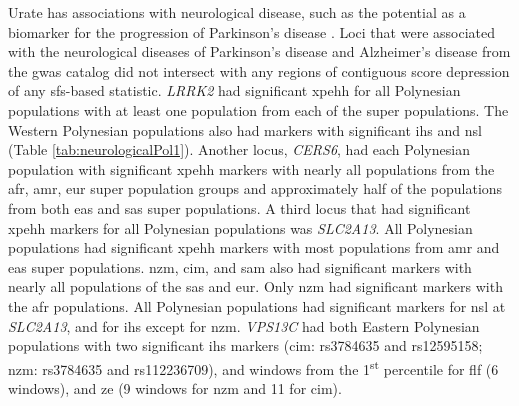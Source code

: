 \documentclass[]{report}
\begin{document}
Urate has associations with neurological disease, such as the potential
as a biomarker for the progression of Parkinson's disease
\citep{Wen2017}. Loci that were associated with the neurological
diseases of Parkinson's disease and Alzheimer's disease from the
\gls{gwas} catalog did not intersect with any regions of contiguous
score depression of any \gls{sfs}-based statistic. \emph{LRRK2} had
significant \gls{xpehh} for all Polynesian populations with at least one
population from each of the super populations. The Western Polynesian
populations also had markers with significant \gls{ihs} and \gls{nsl}
(Table \ref{tab:neurologicalPol1}). Another locus, \emph{CERS6}, had
each Polynesian population with significant \gls{xpehh} markers with
nearly all populations from the \gls{afr}, \gls{amr}, \gls{eur} super
population groups and approximately half of the populations from both
\gls{eas} and \gls{sas} super populations. A third locus that had
significant \gls{xpehh} markers for all Polynesian populations was
\emph{SLC2A13}. All Polynesian populations had significant \gls{xpehh}
markers with most populations from \gls{amr} and \gls{eas} super
populations. \Gls{nzm}, \gls{cim}, and \gls{sam} also had significant
markers with nearly all populations of the \gls{sas} and \gls{eur}. Only
\gls{nzm} had significant markers with the \gls{afr} populations. All
Polynesian populations had significant markers for \gls{nsl} at
\emph{SLC2A13}, and for \gls{ihs} except for \gls{nzm}. \emph{VPS13C}
had both Eastern Polynesian populations with two significant \gls{ihs}
markers (\gls{cim}: rs3784635 and rs12595158; \gls{nzm}: rs3784635 and
rs112236709), and windows from the 1\textsuperscript{st} percentile for
\gls{flf} (6 windows), and \gls{ze} (9 windows for \gls{nzm} and 11 for
\gls{cim}).

\begingroup\fontsize{8}{10}\selectfont
\end{document}
